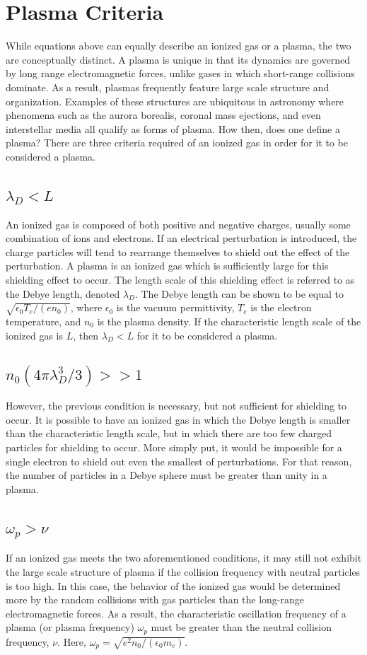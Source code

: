 \section{Plasma Criteria}
While equations above can equally describe an ionized gas or a plasma,
the two are conceptually distinct. A plasma is unique in that its
dynamics are governed by long range electromagnetic forces, unlike gases
in which short-range collisions dominate. As a result, plasmas
frequently feature large scale structure and organization. Examples of
these structures are ubiquitous in astronomy where phenomena such as the
aurora borealis, coronal mass ejections, and even interstellar media all
qualify as forms of plasma. How then, does one define a plasma? There
are three criteria required of an ionized gas in order for it to be
considered a plasma.

\subsection{$\lambda_D < L$}
An ionized gas is composed of both positive and negative charges,
usually some combination of ions and electrons. If an electrical
perturbation is introduced, the charge particles will tend to rearrange
themselves to shield out the effect of the perturbation. A plasma is an
ionized gas which is sufficiently large for this shielding effect to
occur. The length scale of this shielding effect is referred to as the
Debye length, denoted $\lambda_D$. The Debye length can be shown to be
equal to $\sqrt{\epsilon_0T_e/(en_0)}$, where $\epsilon_0$ is the vacuum
permittivity, $T_e$ is the electron temperature, and $n_0$ is the plasma
density. If the characteristic length scale of the ionized gas is $L$,
then $\lambda_D < L$ for it to be considered a plasma.

\subsection{$n_0(4\pi \lambda_D^3/3) >> 1$}
However, the previous condition is necessary, but not sufficient for
shielding to occur. It is possible to have an ionized gas in which the
Debye length is smaller than the characteristic length scale, but in
which there are too few charged particles for shielding to occur. More
simply put, it would be impossible for a single electron to shield out
even the smallest of perturbations. For that reason, the number of
particles in a Debye sphere must be greater than unity in a plasma.

\subsection{$\omega_p > \nu$}
If an ionized gas meets the two aforementioned conditions, it may still
not exhibit the large scale structure of plasma if the collision
frequency with neutral particles is too high. In this case, the behavior
of the ionized gas would be determined more by the random collisions
with gas particles than the long-range electromagnetic forces. As a
result, the characteristic oscillation frequency of a plasma (or plasma
frequency) $\omega_p$ must be greater than the neutral collision
frequency, $\nu$. Here, $\omega_p = \sqrt{e^2n_0/(\epsilon_0
m_e)}$.

